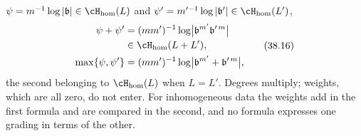 \begin{proposition}
\begin{enumerate}
 $\psi=m^{-1}\log|\mathfrak b|\in\cH_{\mathrm{hom}}(L)$ and
 $\psi'=m'^{-1}\log|\mathfrak b'|\in\cH_{\mathrm{hom}}(L')$,
\[
 \begin{aligned}
 \psi+\psi'&=(mm')^{-1}\log\bigl|\mathfrak b^{m'}\mathfrak b'^{\,m}\bigr|\\
 &\in\cH_{\mathrm{hom}}(L+L'),\\
 \max\{\psi,\psi'\}
 &=(mm')^{-1}\log\bigl|\mathfrak b^{m'}+\mathfrak b'^{\,m}\bigr|,
 \end{aligned}
\tag{38.16}\label{eq:ch38-two-gradings-operations}
\]
 the second belonging to $\cH_{\mathrm{hom}}(L)$ when $L=L'$.
 Degrees multiply; weights, which are all zero, do not enter.  For
 inhomogeneous data the weights add in the first formula and are compared
 in the second, and no formula expresses one grading in terms of the other.
\end{enumerate}
\end{proposition}

